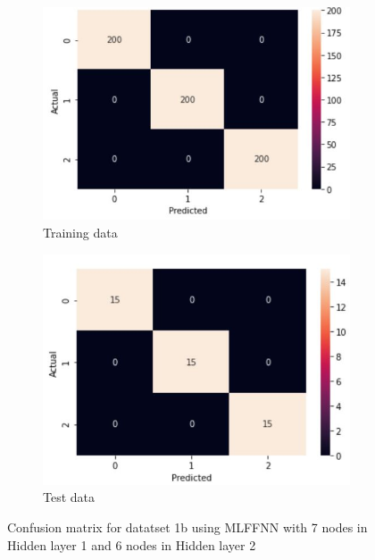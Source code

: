 \documentclass[11pt]{article}
\begin{document}
\begin{figure}[h]
\centering
	\begin{subfigure}[b]{0.45\textwidth}
	\centering
	\includegraphics[scale=0.45]{dataset1b_mlffnn_cm_train.jpg}
	\caption{Training data}
	\label{fig:fig2.1.1.1}
	\end{subfigure}
	\begin{subfigure}[b]{0.45\textwidth}
	\centering
	\includegraphics[scale=0.45]{dataset1b_mlffnn_cm_test.jpg}
	\caption{Test data}
	\label{fig:fig2.1.1.2}
	\end{subfigure}
\caption{Confusion matrix for datatset 1b using MLFFNN with 7 nodes in Hidden layer 1 and 6 nodes in Hidden layer 2}
\label{fig:fig2.1.1}
\end{figure}
\end{document}

